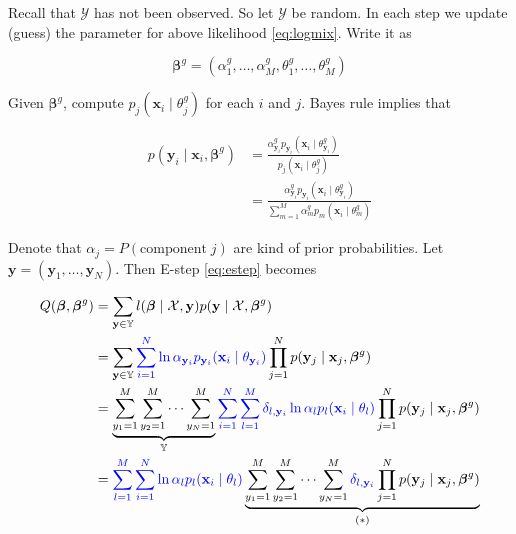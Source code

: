 \documentclass[]{book}
\theoremstyle{definition}
\theoremstyle{definition}
\theoremstyle{definition}
\theoremstyle{remark}
\begin{document}
Recall that \(\mathcal{Y}\) has not been observed. So let \(\mathcal{Y}\) be random. In each step we update (guess) the parameter for above likelihood \eqref{eq:logmix}. Write it as

\[\boldsymbol\beta^g = (\alpha_1^g, \ldots, \alpha_M^g, \theta_1^g, \ldots, \theta_M^g)\]

Given \(\boldsymbol\beta^g\), compute \(p_j(\mathbf{x}_i \mid \theta_j^g)\) for each \(i\) and \(j\). Bayes rule implies that

\begin{equation}
  \begin{split}
    p(\mathbf{y}_i \mid \mathbf{x}_i, \boldsymbol\beta^g) & = \frac{\alpha_{\mathbf{y}_i}^g p_{\mathbf{y}_i}(\mathbf{x}_i \mid \theta_{\mathbf{y}_i}^g)}{p_j(\mathbf{x}_i \mid \theta_j^g)} \\
    & = \frac{\alpha_{\mathbf{y}_i}^g p_{\mathbf{y}_i}(\mathbf{x}_i \mid \theta_{\mathbf{y}_i}^g)}{\sum\limits_{m = 1}^M \alpha_m^g p_m(\mathbf{x}_i \mid \theta_m^g)}
  \end{split}
  \label{eq:mixbayes}
\end{equation}

Denote that \(\alpha_j = P(\text{component}\; j)\) are kind of prior probabilities. Let \(\mathbf{y} = (\mathbf{y}_1, \ldots, \mathbf{y}_N)\). Then E-step \eqref{eq:estep} becomes

\begin{equation}
  \begin{split}
    Q(\boldsymbol\beta, \boldsymbol\beta^g) & = \sum_{\mathbf{y} \in \mathbb{Y}} l(\boldsymbol\beta \mid \mathcal{X}, \mathbf{y}) p(\mathbf{y} \mid \mathcal{X}, \boldsymbol\beta^g) \\
    & = \sum_{\mathbf{y} \in \mathbb{Y}} {\color{blue}{\sum_{i = 1}^N \ln \alpha_{\mathbf{y}_i} p_{\mathbf{y}_i}(\mathbf{x}_i \mid \theta_{\mathbf{y}_i})}} \prod_{j = 1}^N p(\mathbf{y}_j \mid \mathbf{x}_j, \boldsymbol\beta^g) \\
    & = \underbrace{\sum_{y_1 = 1}^M \sum_{y_2 = 1}^M \cdots \sum_{y_N = 1}^M}_{\mathbb{Y}} {\color{blue}{\sum_{i = 1}^N \sum_{l = 1}^M \delta_{l, \mathbf{y}_i} \ln \alpha_l p_l (\mathbf{x}_i \mid \theta_l)}} \prod_{j = 1}^N p(\mathbf{y}_j \mid \mathbf{x}_j, \boldsymbol\beta^g) \\
    & = {\color{blue}{\sum_{l = 1}^M \sum_{i = 1}^N \ln \alpha_l p_l (\mathbf{x}_i \mid \theta_l)}} \underbrace{\sum_{y_1 = 1}^M \sum_{y_2 = 1}^M \cdots \sum_{y_N = 1}^M {\color{blue}{\delta_{l, \mathbf{y}_i}}} \prod_{j = 1}^N p(\mathbf{y}_j \mid \mathbf{x}_j, \boldsymbol\beta^g)}_{(\ast)}
  \end{split}
  \label{eq:mixcond}
\end{equation}
\end{document}
